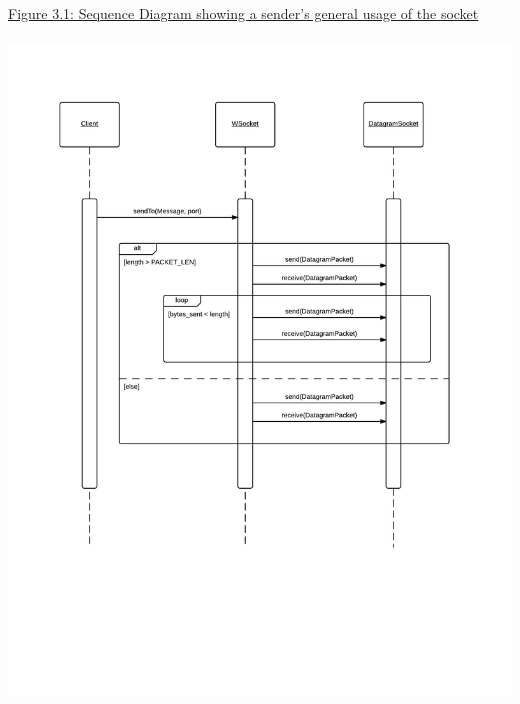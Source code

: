 \documentclass[11pt,english]{article}
\begin{document}
\newpage
\underline{Figure 3.1: Sequence Diagram showing a sender's general usage of the socket} \\
\vspace{5mm}\\
\includegraphics[width=6.2in]{figures/comm-protocol_seq-diagram_client.png}
\end{document}
